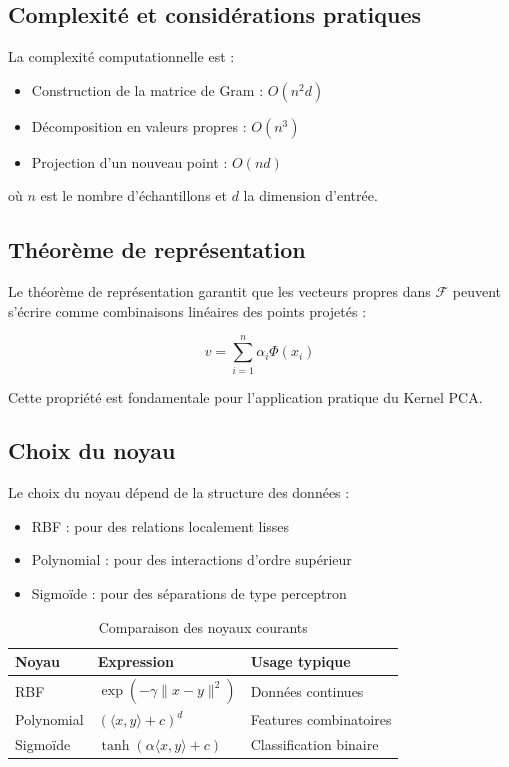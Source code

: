 \documentclass[a4paper,12pt]{report}
\begin{document}
\subsection{Complexité et considérations pratiques}

La complexité computationnelle est :
\begin{itemize}
  \item Construction de la matrice de Gram : $O(n^2d)$
  \item Décomposition en valeurs propres : $O(n^3)$
  \item Projection d'un nouveau point : $O(nd)$
\end{itemize}

où $n$ est le nombre d'échantillons et $d$ la dimension d'entrée.

\subsection{Théorème de représentation}

Le théorème de représentation garantit que les vecteurs propres dans $\mathcal{F}$ peuvent s'écrire comme combinaisons linéaires des points projetés :

\[
v = \sum_{i=1}^n \alpha_i \Phi(x_i)
\]

Cette propriété est fondamentale pour l'application pratique du Kernel PCA.

\subsection{Choix du noyau}

Le choix du noyau dépend de la structure des données :
\begin{itemize}
  \item RBF : pour des relations localement lisses
  \item Polynomial : pour des interactions d'ordre supérieur
  \item Sigmoïde : pour des séparations de type perceptron
\end{itemize}

\begin{table}[H]
  \centering
  \begin{tabular}{|l|l|l|}
    \hline
    \textbf{Noyau} & \textbf{Expression} & \textbf{Usage typique} \\
    \hline
    RBF & $\exp(-\gamma\|x-y\|^2)$ & Données continues \\
    Polynomial & $(\langle x,y \rangle + c)^d$ & Features combinatoires \\
    Sigmoïde & $\tanh(\alpha\langle x,y \rangle + c)$ & Classification binaire \\
    \hline
  \end{tabular}
  \caption{Comparaison des noyaux courants}
  \label{tab:kernels}
\end{table} %
\end{document}
